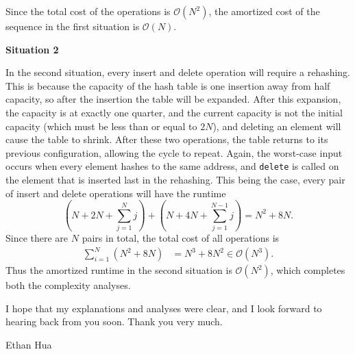 \documentclass[11pt]{article}
\begin{document}
    Since the total cost of the operations is \(\mathcal{O} (N^2)\), the amortized cost of the sequence in the first situation is \(\mathcal{O} (N)\).

    \medskip

    \textbf{Situation 2}

    In the second situation, every insert and delete operation will require a rehashing. This is because the capacity of the hash table is one insertion away from half capacity, so after the insertion the table will be expanded. After this expansion, the capacity is at exactly one quarter, and the current capacity is not the initial capacity (which must be less than or equal to \(2N\)), and deleting an element will cause the table to shrink. After these two operations, the table returns to its previous configuration, allowing the cycle to repeat. Again, the worst-case input occurs when every element hashes to the same address, and \texttt{delete} is called on the element that is inserted last in the rehashing. This being the case, every pair of insert and delete operations will have the runtime
    \[
        \left(N + 2N + \sum_{j=1}^{N} j\right) + \left( N + 4N + \sum_{j=1}^{N-1} j \right) = N^2 + 8N.
    \]
    Since there are \(N\) pairs in total, the total cost of all operations is
    \begin{align*}
        \sum_{i=1}^{N} (N^2 + 8N) &= N^3 + 8N^2 \in \mathcal{O} (N^3).
    \end{align*}
    Thus the amortized runtime in the second situation is \(\mathcal{O} (N^2)\), which completes both the complexity analyses.
    
    I hope that my explanations and analyses were clear, and I look forward to hearing back from you soon. Thank you very much.

    \medskip

    Ethan Hua
\end{document}
